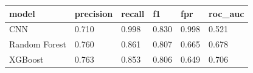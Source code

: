 \begin{tabular}{llllll}
\toprule
model & precision & recall & f1 & fpr & roc_auc \\
\midrule
CNN & 0.710 & 0.998 & 0.830 & 0.998 & 0.521 \\
Random Forest & 0.760 & 0.861 & 0.807 & 0.665 & 0.678 \\
XGBoost & 0.763 & 0.853 & 0.806 & 0.649 & 0.706 \\
\bottomrule
\end{tabular}
